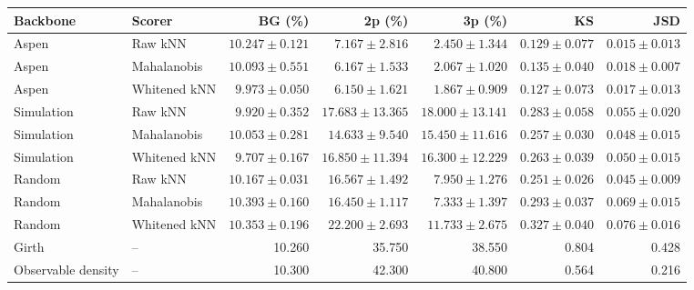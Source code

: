 \begin{tabular}{llrrrrr}
\toprule
Backbone & Scorer & BG (\%) & 2p (\%) & 3p (\%) & KS & JSD \\
\midrule
Aspen & Raw kNN & $10.247\pm0.121$ & $7.167\pm2.816$ & $2.450\pm1.344$ & $0.129\pm0.077$ & $0.015\pm0.013$ \\
Aspen & Mahalanobis & $10.093\pm0.551$ & $6.167\pm1.533$ & $2.067\pm1.020$ & $0.135\pm0.040$ & $0.018\pm0.007$ \\
Aspen & Whitened kNN & $9.973\pm0.050$ & $6.150\pm1.621$ & $1.867\pm0.909$ & $0.127\pm0.073$ & $0.017\pm0.013$ \\
Simulation & Raw kNN & $9.920\pm0.352$ & $17.683\pm13.365$ & $18.000\pm13.141$ & $0.283\pm0.058$ & $0.055\pm0.020$ \\
Simulation & Mahalanobis & $10.053\pm0.281$ & $14.633\pm9.540$ & $15.450\pm11.616$ & $0.257\pm0.030$ & $0.048\pm0.015$ \\
Simulation & Whitened kNN & $9.707\pm0.167$ & $16.850\pm11.394$ & $16.300\pm12.229$ & $0.263\pm0.039$ & $0.050\pm0.015$ \\
Random & Raw kNN & $10.167\pm0.031$ & $16.567\pm1.492$ & $7.950\pm1.276$ & $0.251\pm0.026$ & $0.045\pm0.009$ \\
Random & Mahalanobis & $10.393\pm0.160$ & $16.450\pm1.117$ & $7.333\pm1.397$ & $0.293\pm0.037$ & $0.069\pm0.015$ \\
Random & Whitened kNN & $10.353\pm0.196$ & $22.200\pm2.693$ & $11.733\pm2.675$ & $0.327\pm0.040$ & $0.076\pm0.016$ \\
Girth & -- & 10.260 & 35.750 & 38.550 & 0.804 & 0.428 \\
Observable density & -- & 10.300 & 42.300 & 40.800 & 0.564 & 0.216 \\
\bottomrule
\end{tabular}
